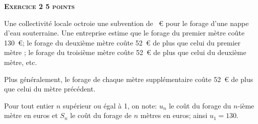 \textbf{\large\textsc{Exercice 2 \hfill 5 points}}

\bigskip

Une collectivité locale octroie une subvention de ~\euro{} pour le forage d'une nappe d'eau souterraine. Une entreprise estime que le forage du premier mètre coûte 130~\euro; le
forage du deuxième mètre coûte 52~\euro{} de plus que celui du premier mètre ; le forage du
troisième mètre coûte 52~\euro{} de plus que celui du deuxième mètre, etc.

Plus généralement, le forage de chaque mètre supplémentaire coûte 52~\euro{} de plus que celui
du mètre précédent.

Pour tout entier $n$ supérieur ou égal à 1, on note: $u_n$ le coût du forage du $n$-ième mètre en
euros et $S_n$ le coût du forage de $n$ mètres en euros; ainsi $u_1=130$.

\medskip

